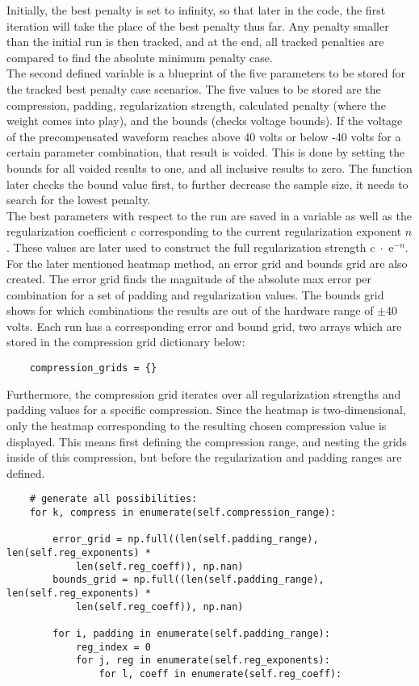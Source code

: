 Initially, the best penalty is set to infinity, so that later in the code, the first iteration will take the place of the best penalty thus far. Any penalty smaller than the initial run is then tracked, and at the end, all tracked penalties are compared to find the absolute minimum penalty case.
\\
The second defined variable is a blueprint of the five parameters to be stored for the tracked best penalty case scenarios. The five values to be stored are the compression, padding, regularization strength, calculated penalty (where the weight comes into play), and the bounds (checks voltage bounds). If the voltage of the precompensated waveform reaches above 40 volts or below -40 volts for a certain parameter combination, that result is voided. This is done by setting the bounds for all voided results to one, and all inclusive results to zero. The function later checks the bound value first, to further decrease the sample size, it needs to search for the lowest penalty.
\\
The best parameters with respect to the run are saved in a variable as well as the regularization coefficient $c$ corresponding to the current regularization exponent $n$. These values are later used to construct the full regularization strength $c \; \cdot$ e$^{-n}$.
\\
For the later mentioned heatmap method, an error grid and bounds grid are also created. The error grid finds the magnitude of the absolute max error per combination for a set of padding and regularization values. The bounds grid shows for which combinations the results are out of the hardware range of $\pm 40$ volts. Each run has a corresponding error and bound grid, two arrays which are stored in the compression grid dictionary below:

\begin{verbatim}
    compression_grids = {}
\end{verbatim}

Furthermore, the compression grid iterates over all regularization strengths and padding values for a specific compression. Since the heatmap is two-dimensional, only the heatmap corresponding to the resulting chosen compression value is displayed. This means first defining the compression range, and nesting the grids inside of this compression, but before the regularization and padding ranges are defined.

\begin{verbatim}
    # generate all possibilities:
    for k, compress in enumerate(self.compression_range):

        error_grid = np.full((len(self.padding_range), len(self.reg_exponents) * 
            len(self.reg_coeff)), np.nan)
        bounds_grid = np.full((len(self.padding_range), len(self.reg_exponents) * 
            len(self.reg_coeff)), np.nan)
        
        for i, padding in enumerate(self.padding_range):
            reg_index = 0
            for j, reg in enumerate(self.reg_exponents):
                for l, coeff in enumerate(self.reg_coeff):
\end{verbatim}

